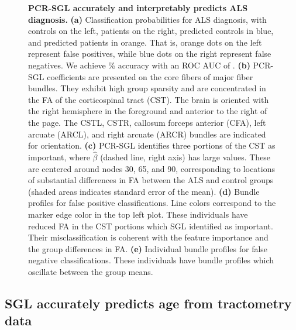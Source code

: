 \documentclass[10pt,letterpaper]{article}
\begin{document}
\begin{figure}[b!]
    {\label{fig:class-results:probs}}
    {\label{fig:class-results:coefs3d}}
    {\label{fig:class-results:tract-profiles}}
    {\label{fig:class-results:false-positives}}
    {\label{fig:class-results:false-negatives}}
    \caption{
    {\bf PCR-SGL accurately and interpretably predicts ALS diagnosis.}
    {\bf (a)} Classification probabilities for ALS diagnosis, with
    controls on the left, patients on the right, predicted controls in
    blue, and predicted patients in orange. That is, orange dots on the left
    represent false positives, while blue dots on the right represent
    false negatives. We achieve {\protect\alsAccuracy}\% accuracy with an
    ROC AUC of {\protect\alsRocAuc}.
    {\bf (b)} PCR-SGL coefficients are presented on the core fibers of major
    fiber bundles. They exhibit high group sparsity and are concentrated
    in the FA of the corticospinal tract (CST).
    The brain is oriented with the right hemisphere
    in the foreground and anterior to the right of the page. The CSTL, CSTR,
    callosum forceps anterior (CFA), left arcuate (ARCL), and right arcuate (ARCR)
    bundles are indicated for orientation.
    {\bf (c)} PCR-SGL identifies three portions of the CST as important,
    where $\hat{\beta}$ (dashed line, right axis) has large values. These
    are centered around nodes 30, 65, and 90, corresponding to locations
    of substantial differences in FA between the ALS and control groups
    (shaded areas indicates standard error of the mean).
    {\bf (d)} Bundle profiles for false positive classifications. Line
    colors correspond to the marker edge color in the top left plot.
    These individuals have reduced FA in the CST portions which SGL
    identified as important. Their misclassification is coherent with the
    feature importance and the group differences in FA.
    {\bf (e)} Individual bundle profiles for false negative
    classifications. These individuals have bundle profiles which
    oscillate between the group means.
    \label{fig:class-results}
    }
\end{figure}

\subsection*{SGL accurately predicts age from tractometry data}
\end{document}
